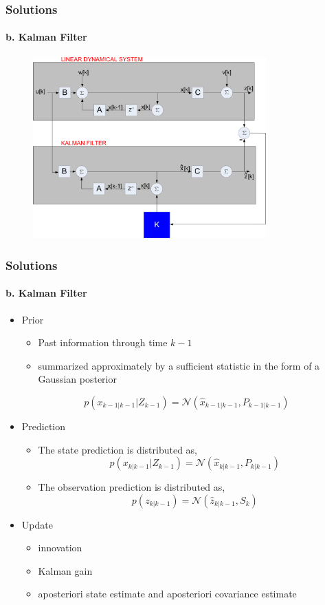 \documentclass{beamer}
\begin{document}
\begin{frame}
\frametitle{Solutions}
\framesubtitle{b. Kalman Filter}
\mypagenum
\begin{figure}
\includegraphics[width=0.8\textwidth]{figs/TRK_KalmanFilter_blockDiagram.pdf}
\end{figure}
\end{frame}




\begin{frame}
\frametitle{Solutions}
\framesubtitle{b. Kalman Filter}
\mypagenum
\begin{itemize}
\item {\color{red}Prior}
\begin{itemize}
\item Past information through time $k-1$
\item summarized approximately by a sufficient statistic in the form of a Gaussian posterior
\end{itemize}
\begin{equation*}
p(x_{k-1|k-1}|Z_{k-1})=\mathcal{N}  (\hat{x}_{k-1|k-1}, P_{k-1|k-1})
\end{equation*}
\item {\color{red}Prediction}
\begin{itemize}  
\item The state prediction is distributed as,
\begin{equation*}
p(x_{k|k-1}|Z_{k-1})=\mathcal{N}  (\hat{x}_{k|k-1}, P_{k|k-1})
\end{equation*}
\item The observation prediction is distributed as,
\begin{equation*}
p(z_{k|k-1})=\mathcal{N}  (\hat{z}_{k|k-1}, S_k)
\end{equation*}
\end{itemize}
\item {\color{red}Update}
\begin{itemize} 
\item innovation
\item Kalman gain
\item aposteriori state estimate and aposteriori covariance estimate
\end{itemize}
\end{itemize}
\end{frame}
\end{document}
